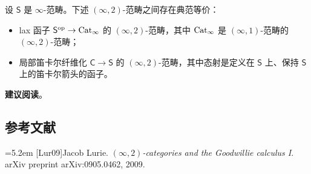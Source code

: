 
设 $\mathsf{S}$ 是 $\infty$-范畴。下述 $(\infty,2)$-范畴之间存在典范等价：
\begin{itemize}[leftmargin=2.2em,itemsep=0.1em]
\item lax 函子 $\mathsf{S}^{\mathrm{op}}\to\operatorname{Cat}_{\infty}$ 的 $(\infty,2)$-范畴，其中 $\operatorname{Cat}_{\infty}$ 是 $(\infty,1)$-范畴的 $(\infty,2)$-范畴；
\item 局部笛卡尔纤维化 $\mathsf{C}\to\mathsf{S}$ 的 $(\infty,2)$-范畴，其中态射是定义在 $\mathsf{S}$ 上、保持 $\mathsf{S}$ 上的笛卡尔箭头的函子。
\end{itemize}


\nitem\label{L19-A.1} \textbf{建议阅读}\quad [Lur09]。

\subsection*{参考文献}
\par\noindent\hangindent=5.2em [Lur09]\hspace{0.6em}Jacob Lurie. \emph{$(\infty,2)$-categories and the Goodwillie calculus I}. arXiv preprint arXiv:0905.0462, 2009.
